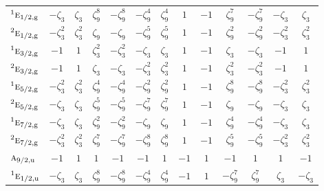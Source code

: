 \documentclass[10pt,a4paper]{article}
\numberwithin{equation}{section}
\newcommand{\irr}[1]{\text{\normalfont\scshape #1}}
\newcommand{\conjpair}[1]{{}^{#1}}
\newcommand{\ptag}[1]{\mathrm{#1}}
\newcommand{\rootunity}[1]{\zeta_{#1}}
\begin{document}
{\begin{longtable}{@{}lcccccccccccc@{}}
$\conjpair{1}\irr{e}_{1/2,\ptag{g}}$ & $-\rootunity{3}$ & $\rootunity{3}$ & $\rootunity{9}^{8}$ & $-\rootunity{9}^{8}$ & $-\rootunity{9}^{4}$ & $\rootunity{9}^{4}$ & $1$ & $-1$ & $\rootunity{9}^{7}$ & $-\rootunity{9}^{7}$ & $-\rootunity{3}$ & $\rootunity{3}$\\
$\conjpair{2}\irr{e}_{1/2,\ptag{g}}$ & $-\rootunity{3}^{2}$ & $\rootunity{3}^{2}$ & $\rootunity{9}$ & $-\rootunity{9}$ & $-\rootunity{9}^{5}$ & $\rootunity{9}^{5}$ & $1$ & $-1$ & $\rootunity{9}^{2}$ & $-\rootunity{9}^{2}$ & $-\rootunity{3}^{2}$ & $\rootunity{3}^{2}$\\
$\conjpair{1}\irr{e}_{3/2,\ptag{g}}$ & $-1$ & $1$ & $\rootunity{3}^{2}$ & $-\rootunity{3}^{2}$ & $-\rootunity{3}$ & $\rootunity{3}$ & $1$ & $-1$ & $\rootunity{3}$ & $-\rootunity{3}$ & $-1$ & $1$\\
$\conjpair{2}\irr{e}_{3/2,\ptag{g}}$ & $-1$ & $1$ & $\rootunity{3}$ & $-\rootunity{3}$ & $-\rootunity{3}^{2}$ & $\rootunity{3}^{2}$ & $1$ & $-1$ & $\rootunity{3}^{2}$ & $-\rootunity{3}^{2}$ & $-1$ & $1$\\
$\conjpair{1}\irr{e}_{5/2,\ptag{g}}$ & $-\rootunity{3}^{2}$ & $\rootunity{3}^{2}$ & $\rootunity{9}^{4}$ & $-\rootunity{9}^{4}$ & $-\rootunity{9}^{2}$ & $\rootunity{9}^{2}$ & $1$ & $-1$ & $\rootunity{9}^{8}$ & $-\rootunity{9}^{8}$ & $-\rootunity{3}^{2}$ & $\rootunity{3}^{2}$\\
$\conjpair{2}\irr{e}_{5/2,\ptag{g}}$ & $-\rootunity{3}$ & $\rootunity{3}$ & $\rootunity{9}^{5}$ & $-\rootunity{9}^{5}$ & $-\rootunity{9}^{7}$ & $\rootunity{9}^{7}$ & $1$ & $-1$ & $\rootunity{9}$ & $-\rootunity{9}$ & $-\rootunity{3}$ & $\rootunity{3}$\\
$\conjpair{1}\irr{e}_{7/2,\ptag{g}}$ & $-\rootunity{3}$ & $\rootunity{3}$ & $\rootunity{9}^{2}$ & $-\rootunity{9}^{2}$ & $-\rootunity{9}$ & $\rootunity{9}$ & $1$ & $-1$ & $\rootunity{9}^{4}$ & $-\rootunity{9}^{4}$ & $-\rootunity{3}$ & $\rootunity{3}$\\
$\conjpair{2}\irr{e}_{7/2,\ptag{g}}$ & $-\rootunity{3}^{2}$ & $\rootunity{3}^{2}$ & $\rootunity{9}^{7}$ & $-\rootunity{9}^{7}$ & $-\rootunity{9}^{8}$ & $\rootunity{9}^{8}$ & $1$ & $-1$ & $\rootunity{9}^{5}$ & $-\rootunity{9}^{5}$ & $-\rootunity{3}^{2}$ & $\rootunity{3}^{2}$\\
$\irr{a}_{9/2,\ptag{u}}$ & $-1$ & $1$ & $1$ & $-1$ & $-1$ & $1$ & $-1$ & $1$ & $-1$ & $1$ & $1$ & $-1$\\
$\conjpair{1}\irr{e}_{1/2,\ptag{u}}$ & $-\rootunity{3}$ & $\rootunity{3}$ & $\rootunity{9}^{8}$ & $-\rootunity{9}^{8}$ & $-\rootunity{9}^{4}$ & $\rootunity{9}^{4}$ & $-1$ & $1$ & $-\rootunity{9}^{7}$ & $\rootunity{9}^{7}$ & $\rootunity{3}$ & $-\rootunity{3}$\\

\end{longtable}}
\end{document}

